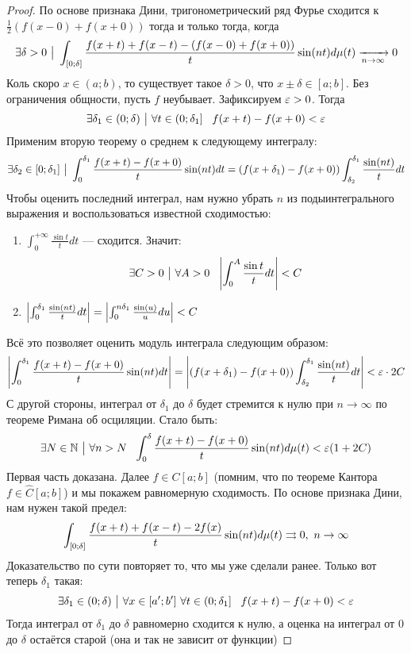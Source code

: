 \begin{proof}
	По основе признака Дини, тригонометрический ряд Фурье сходится к $\frac{1}{2}(f(x - 0) + f(x + 0))$ тогда и только тогда, когда
	\[
		\exists \delta > 0 \ \big|\  \int_{[0; \delta]} \frac{f(x + t) + f(x - t) - (f(x - 0) + f(x + 0))}{t}\sin(nt)d\mu(t) \xrightarrow[n \to \infty]{} 0
	\]
	Коль скоро $x \in (a; b)$, то существует такое $\delta > 0$, что $x \pm \delta \in [a; b]$. Без ограничения общности, пусть $f$ неубывает. Зафиксируем $\varepsilon > 0$. Тогда
	\[
		\exists \delta_1 \in (0; \delta) \ \big|\  \forall t \in \left(0; \delta_1\right]\ \ f(x + t) - f(x + 0) < \varepsilon
	\]
	Применим вторую теорему о среднем к следующему интегралу:
	\[
		\exists \delta_2 \in [0; \delta_1] \ \big|\  \int_0^{\delta_1} \frac{f(x + t) - f(x + 0)}{t}\sin(nt)dt = (f(x + \delta_1) - f(x + 0)) \int_{\delta_2}^{\delta_1} \frac{\sin(nt)}{t}dt
	\]
	Чтобы оценить последний интеграл, нам нужно убрать $n$ из подыинтегрального выражения и воспользоваться известной сходимостью:
	\begin{enumerate}
		\item $\int_0^{+\infty} \frac{\sin t}{t}dt$ --- сходится. Значит:
		\[
			\exists C > 0 \ \big|\  \forall A > 0\ \ \left|\int_0^A \frac{\sin t}{t}dt\right| < C
		\]
		
		\item \(\left|\int_0^{\delta_1} \frac{\sin(nt)}{t}dt\right| = \left|\int_0^{n\delta_1} \frac{\sin(u)}{u}du\right| < C\)
	\end{enumerate}
	Всё это позволяет оценить модуль интеграла следующим образом:
	\[
		\left|\int_0^{\delta_1} \frac{f(x + t) - f(x + 0)}{t}\sin(nt)dt\right| = \left|(f(x + \delta_1) - f(x + 0)) \int_{\delta_2}^{\delta_1} \frac{\sin(nt)}{t}dt\right| <
		\\
		\varepsilon \cdot 2C
	\]
	С другой стороны, интеграл от $\delta_1$ до $\delta$ будет стремится к нулю при $n \to \infty$ по теореме Римана об осциляции. Стало быть:
	\[
		\exists N \in \N \such \forall n > N\ \ \int_0^{\delta} \frac{f(x + t) - f(x + 0)}{t} \sin(nt)d\mu(t) < \eps(1 + 2C)
	\]
	Первая часть доказана. Далее $f \in C[a; b]$ (помним, что по теореме Кантора $f \in \hat{C}[a; b]$) и мы покажем равномерную сходимость. По основе признака Дини, нам нужен такой предел:
	\[
		\int_{[0; \delta]} \frac{f(x + t) + f(x - t) - 2f(x)}{t}\sin(nt)d\mu(t) \rightrightarrows 0,\ n \to \infty
	\]
	Доказательство по сути повторяет то, что мы уже сделали ранее. Только вот теперь $\delta_1$ такая:
	\[
		\exists \delta_1 \in (0; \delta) \ \big|\  \forall x \in [a'; b']\ \forall t \in \left(0; \delta_1\right]\ \ f(x + t) - f(x + 0) < \varepsilon
	\]
	Тогда интеграл от $\delta_1$ до $\delta$ равномерно сходится к нулю, а оценка на интеграл от 0 до $\delta$ остаётся старой (она и так не зависит от функции)
\end{proof}

